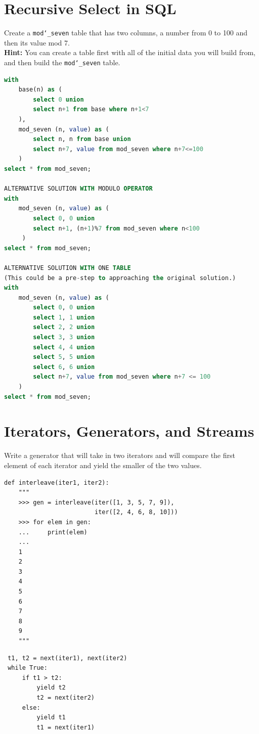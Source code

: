 \documentclass{exam}
\begin{document}
\begin{questions}
\section{Recursive Select in SQL}
\begin{blocksection}
\question Create a \texttt{mod\char`_seven} table that has two columns, a number
from 0 to 100 and then its value mod 7.\\
\textbf{Hint:} You can create a table first with all of the initial data you
will build from, and then build the \texttt{mod\char`_seven} table.

\begin{solution}[1in]
\begin{lstlisting}[language=SQL]
with
    base(n) as (
        select 0 union
        select n+1 from base where n+1<7
    ),
    mod_seven (n, value) as (
        select n, n from base union
        select n+7, value from mod_seven where n+7<=100
    )
select * from mod_seven;

ALTERNATIVE SOLUTION WITH MODULO OPERATOR
with
    mod_seven (n, value) as (
        select 0, 0 union
        select n+1, (n+1)%7 from mod_seven where n<100
     )
select * from mod_seven;

ALTERNATIVE SOLUTION WITH ONE TABLE
(This could be a pre-step to approaching the original solution.)
with
    mod_seven (n, value) as (
        select 0, 0 union
        select 1, 1 union
        select 2, 2 union
        select 3, 3 union
        select 4, 4 union
        select 5, 5 union
        select 6, 6 union
        select n+7, value from mod_seven where n+7 <= 100
    )
select * from mod_seven;
\end{lstlisting}
\end{solution}
\end{blocksection}

\section{Iterators, Generators, and Streams}
\begin{blocksection}
\question Write a generator that will take in two iterators and will compare the
first element of each iterator and yield the smaller of the two values.

\begin{lstlisting}
def interleave(iter1, iter2):
    """
    >>> gen = interleave(iter([1, 3, 5, 7, 9]),
                         iter([2, 4, 6, 8, 10]))
    >>> for elem in gen:
    ...     print(elem)
    ...
    1
    2
    3
    4
    5
    6
    7
    8
    9
    """
\end{lstlisting}
\begin{solution}[1in]
\begin{lstlisting}
 t1, t2 = next(iter1), next(iter2)
 while True:
     if t1 > t2:
         yield t2
         t2 = next(iter2)
     else:
         yield t1
         t1 = next(iter1)
\end{lstlisting}
\end{solution}


\end{blocksection}
\end{questions}
\end{document}
